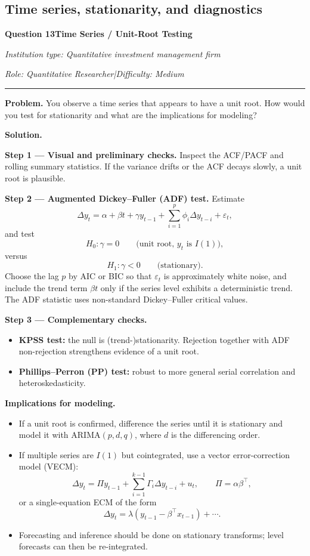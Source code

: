 \documentclass[11pt,letterpaper,openany]{book}
\newcommand{\InterviewQuestionHeader}[5]{%
  \vspace{1.0em}%
  {\large\bfseries #1\enspace #4\par}%
  {\small\itshape Institution type: #2\par}%
  {\small\itshape Role: #3\enspace |\enspace Difficulty: #5\par}%
  \vspace{0.25em}\hrule\vspace{0.45em}%
}
\begin{document}
\subsection{Time series, stationarity, and diagnostics}

\InterviewQuestionHeader{Question 13}{Quantitative investment management firm}{Quantitative Researcher}{Time Series / Unit-Root Testing}{Medium}
\textbf{Problem.} You observe a time series that appears to have a unit root. How would you test for stationarity and what are the implications for modeling?

\textbf{Solution.}

\textbf{Step 1 --- Visual and preliminary checks.} Inspect the ACF/PACF and rolling summary statistics. If the variance drifts or the ACF decays slowly, a unit root is plausible.

\textbf{Step 2 --- Augmented Dickey--Fuller (ADF) test.} Estimate
\[
\Delta y_t = \alpha + \beta t + \gamma y_{t-1} + \sum_{i=1}^{p}\phi_i \Delta y_{t-i} + \varepsilon_t,
\]
and test
\[
H_0:\gamma=0 \qquad \text{(unit root, \(y_t\) is \(I(1)\))},
\]
versus
\[
H_1:\gamma<0 \qquad \text{(stationary)}.
\]
Choose the lag \(p\) by AIC or BIC so that \(\varepsilon_t\) is approximately white noise, and include the trend term \(\beta t\) only if the series level exhibits a deterministic trend. The ADF statistic uses non-standard Dickey--Fuller critical values.

\textbf{Step 3 --- Complementary checks.}

\begin{itemize}
\item \textbf{KPSS test:} the null is (trend-)stationarity. Rejection together with ADF non-rejection strengthens evidence of a unit root.
\item \textbf{Phillips--Perron (PP) test:} robust to more general serial correlation and heteroskedasticity.
\end{itemize}

\textbf{Implications for modeling.}

\begin{itemize}
\item If a unit root is confirmed, difference the series until it is stationary and model it with ARIMA\((p,d,q)\), where \(d\) is the differencing order.
\item If multiple series are \(I(1)\) but cointegrated, use a vector error-correction model (VECM):
\[
\Delta y_t = \Pi y_{t-1} + \sum_{i=1}^{k-1}\Gamma_i \Delta y_{t-i} + u_t,
\qquad
\Pi=\alpha\beta^\top,
\]
or a single-equation ECM of the form
\[
\Delta y_t = \lambda (y_{t-1}-\beta^\top x_{t-1}) + \cdots.
\]
\item Forecasting and inference should be done on stationary transforms; level forecasts can then be re-integrated.
\end{itemize}
\end{document}
